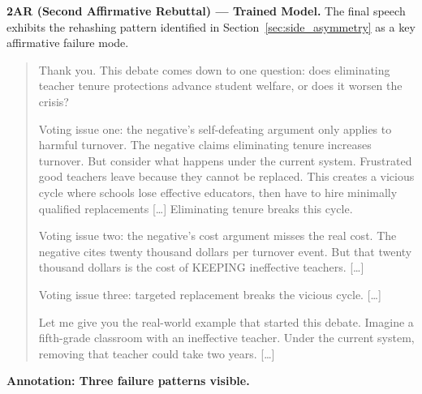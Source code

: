 \medskip
\noindent\textbf{2AR (Second Affirmative Rebuttal) --- Trained Model.}
The final speech exhibits the rehashing pattern identified in
Section~\ref{sec:side_asymmetry} as a key affirmative failure mode.

\begin{quote}
\small
Thank you. This debate comes down to one question: does eliminating teacher
tenure protections advance student welfare, or does it worsen the crisis?

Voting issue one: the negative's self-defeating argument only applies to
harmful turnover. The negative claims eliminating tenure increases turnover.
But consider what happens under the current system. Frustrated good teachers
leave because they cannot be replaced. This creates a vicious cycle where
schools lose effective educators, then have to hire minimally qualified
replacements [\ldots] Eliminating tenure breaks this cycle.

Voting issue two: the negative's cost argument misses the real cost. The
negative cites twenty thousand dollars per turnover event. But that twenty
thousand dollars is the cost of KEEPING ineffective teachers. [\ldots]

Voting issue three: targeted replacement breaks the vicious cycle. [\ldots]

Let me give you the real-world example that started this debate. Imagine a
fifth-grade classroom with an ineffective teacher. Under the current system,
removing that teacher could take two years. [\ldots]
\end{quote}

\noindent\textbf{Annotation: Three failure patterns visible.}

